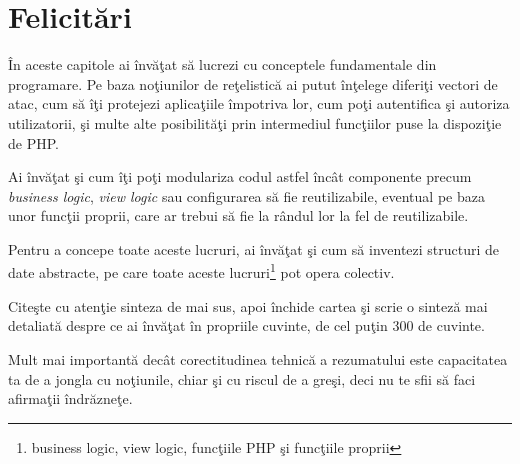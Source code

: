 \section{Felicitări}
În aceste capitole ai învăţat să lucrezi cu conceptele fundamentale
din programare. Pe baza noţiunilor de reţelistică ai putut înţelege
diferiţi vectori de atac, cum să îţi protejezi aplicaţiile împotriva
lor, cum poţi autentifica şi autoriza utilizatorii, şi multe
alte posibilităţi prin intermediul funcţiilor puse la dispoziţie de
PHP.

Ai învăţat şi cum îţi poţi modulariza codul astfel încât componente
precum \textit{business logic}, \textit{view logic} sau configurarea să fie
reutilizabile, eventual pe baza unor funcţii proprii, care ar
trebui să fie la rândul lor la fel de reutilizabile.

Pentru a concepe toate aceste lucruri, ai învăţat şi cum să inventezi
structuri de date abstracte, pe care toate aceste
lucruri\footnote{business logic, view logic, funcţiile PHP şi
funcţiile proprii} pot opera colectiv.

\begin{Exercise}[title={Recapitulare şi sinteză}]
Citeşte cu atenţie sinteza de mai sus, apoi închide cartea şi scrie o
sinteză mai detaliată despre ce ai învăţat în propriile cuvinte,
de cel puţin 300 de cuvinte.

Mult mai importantă dec\^at corectitudinea tehnică a rezumatului
este capacitatea ta de a jongla cu noţiunile, chiar şi cu
riscul de a greşi, deci nu te sfii să faci afirmaţii \^indrăzneţe.
\end{Exercise}

